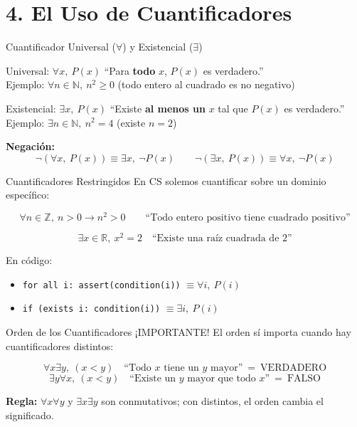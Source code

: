 \documentclass[aspectratio=169,10pt]{beamer}
\begin{document}
\section{4. El Uso de Cuantificadores}

\begin{frame}{Cuantificador Universal ($\forall$) y Existencial ($\exists$)}
\begin{block}{Universal: $\forall x,\ P(x)$}
``Para \textbf{todo} $x$, $P(x)$ es verdadero.'' \\
Ejemplo: $\forall n \in \mathbb{N},\ n^2 \geq 0$ \quad (todo entero al cuadrado es no negativo)
\end{block}
\vfill
\begin{block}{Existencial: $\exists x,\ P(x)$}
``Existe \textbf{al menos un} $x$ tal que $P(x)$ es verdadero.'' \\
Ejemplo: $\exists n \in \mathbb{N},\ n^2 = 4$ \quad (existe $n=2$)
\end{block}
\vfill
\textbf{Negación:}
\[
\neg(\forall x,\ P(x)) \equiv \exists x,\ \neg P(x)
\qquad
\neg(\exists x,\ P(x)) \equiv \forall x,\ \neg P(x)
\]
\end{frame}

\begin{frame}{Cuantificadores Restringidos}
En CS solemos cuantificar sobre un dominio específico:

\[
\forall n \in \mathbb{Z},\ n > 0 \to n^2 > 0
\qquad\text{``Todo entero positivo tiene cuadrado positivo''}
\]

\[
\exists x \in \mathbb{R},\ x^2 = 2 \quad\text{``Existe una raíz cuadrada de 2''}
\]

\vfill
\begin{block}{En código:}
\begin{itemize}
\item \texttt{for all i: assert(condition(i))}  \quad $\equiv \forall i,\ P(i)$
\item \texttt{if (exists i: condition(i))}      \quad $\equiv \exists i,\ P(i)$
\end{itemize}
\end{block}
\end{frame}

\begin{frame}{Orden de los Cuantificadores ¡IMPORTANTE!}
El orden \alert{sí importa} cuando hay cuantificadores distintos:

\[
\forall x \exists y,\ (x < y) \quad\text{``Todo $x$ tiene un $y$ mayor''} \ =\ \text{VERDADERO}
\]
\[
\exists y \forall x,\ (x < y) \quad\text{``Existe un $y$ mayor que todo $x$''} \ =\ \text{FALSO}
\]

\vfill
\textbf{Regla:} $\forall x \forall y$ y $\exists x \exists y$ son conmutativos; con distintos, el orden cambia el significado.
\end{frame}
\end{document}
